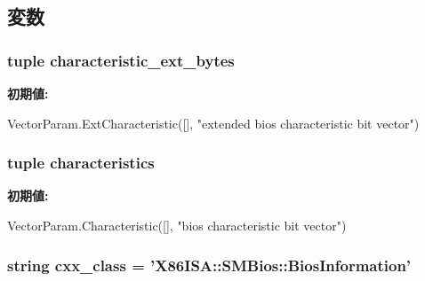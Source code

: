 \subsection{変数}
\hypertarget{classSMBios_1_1X86SMBiosBiosInformation_a86fb1448dd5aa1cacec39707ee5ac79e}{
\subsubsection[{characteristic\_\-ext\_\-bytes}]{\setlength{\rightskip}{0pt plus 5cm}tuple {\bf characteristic\_\-ext\_\-bytes}}}
\label{classSMBios_1_1X86SMBiosBiosInformation_a86fb1448dd5aa1cacec39707ee5ac79e}
{\bfseries 初期値:}
\begin{DoxyCode}
VectorParam.ExtCharacteristic([],
            "extended bios characteristic bit vector")
\end{DoxyCode}
\hypertarget{classSMBios_1_1X86SMBiosBiosInformation_a7eeca92fcd997db286edb761234ec830}{
\subsubsection[{characteristics}]{\setlength{\rightskip}{0pt plus 5cm}tuple {\bf characteristics}}}
\label{classSMBios_1_1X86SMBiosBiosInformation_a7eeca92fcd997db286edb761234ec830}
{\bfseries 初期値:}
\begin{DoxyCode}
VectorParam.Characteristic([],
            "bios characteristic bit vector")
\end{DoxyCode}
\hypertarget{classSMBios_1_1X86SMBiosBiosInformation_a58cd55cd4023648e138237cfc0822ae3}{
\subsubsection[{cxx\_\-class}]{\setlength{\rightskip}{0pt plus 5cm}string {\bf cxx\_\-class} = '{\bf X86ISA::SMBios::BiosInformation}'}}
\label{classSMBios_1_1X86SMBiosBiosInformation_a58cd55cd4023648e138237cfc0822ae3}


